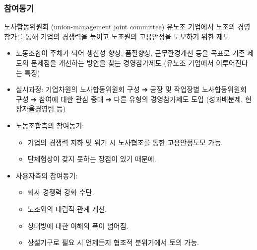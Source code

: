 \documentclass[aspectratio=169,xcolor=dvipsnames,handout]{beamer}
\begin{document}
\begin{frame}[allowframebreaks]
    \frametitle{참여동기}
    \begin{block}{노사합동위원회 (union-management joint committee)}
        유노조 기업에서 노조의 경영참가를 통해 기업의 경쟁력을 높이고 노조원의 고용안정을 도모하기 위한 제도
    \end{block}
    \begin{itemize}[<+->]
        \item 노동조합이 주체가 되어 생산성 향상, 품질향상, 근무환경개선 등을 목표로 기존 제도의 문제점을 개선하는 방안을 찾는 경영참가제도 (유노조 기업에서 이루어진다는 특징)
        \item 실시과정: 기업차원의 노사합동위원회 구성 ➔ 공장 및 작업장별 노사합동위원회 구성 ➔ 참여에 대한 관심 증대 ➔ 다른 유형의 경영참가제도 도입 (성과배분제, 현장자율경영팀 등)
    \framebreak\relax
        \item 노동조합측의 참여동기:
        \begin{itemize}[<+->]
            \item 기업의 경쟁력 저하 및 위기 시 노사협조를 통한 고용안정도모 가능.
            \item 단체협상이 갖지 못하는 장점이 있기 때문에.
        \end{itemize}
        \item 사용자측의 참여동기:
        \begin{itemize}[<+->]
            \item 회사 경쟁력 강화 수단.
            \item 노조와의 대립적 관계 개선.
            \item 상대방에 대한 이해의 폭이 넓어짐.
            \item 상설기구로 필요 시 언제든지 협조적 분위기에서 토의 가능.
        \end{itemize}
    \end{itemize}
\end{frame}
\end{document}
